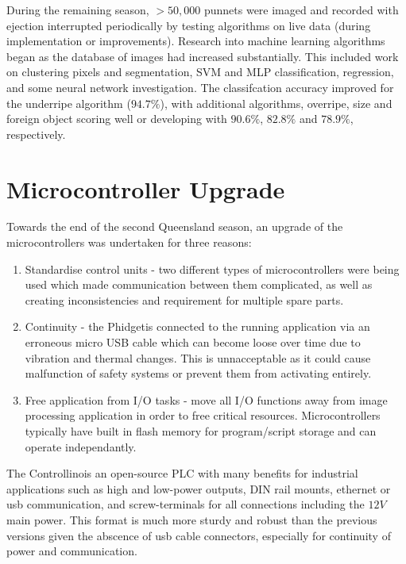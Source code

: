 \documentclass[fleqn,twoside,12pt]{report}
\begin{document}
During the remaining season, $>50,000$ punnets were imaged and recorded with ejection interrupted periodically by testing algorithms on live data (during implementation or improvements). Research into machine learning algorithms began as the database of images had increased substantially. This included work on clustering pixels and segmentation, SVM and MLP classification, regression, and some neural network investigation. The classifcation accuracy improved for the underripe algorithm ($94.7\%$), with additional algorithms, overripe, size and foreign object scoring well or developing with $90.6\%$, $82.8\%$ and $78.9\%$, respectively.


\section{Microcontroller Upgrade}


Towards the end of the second Queensland season, an upgrade of the microcontrollers was undertaken for three reasons:

\begin{enumerate}
	\item Standardise control units - two different types of microcontrollers were being used which made communication between them complicated, as well as creating inconsistencies and requirement for multiple spare parts.
	\item Continuity - the Phidget\texttrademark is connected to the running application via an erroneous micro USB cable which can become loose over time due to vibration and thermal changes. This is unnacceptable as it could cause malfunction of safety systems or prevent them from activating entirely. 
	\item Free application from I/O tasks - move all I/O functions away from image processing application in order to free critical resources. Microcontrollers typically have built in flash memory for program/script storage and can operate independantly.
\end{enumerate}

The Controllino\texttrademark is an open-source PLC with many benefits for industrial applications such as high and low-power outputs, DIN rail mounts, ethernet or usb communication, and screw-terminals for all connections including the $12V$ main power. This format is much more sturdy and robust than the previous versions given the abscence of usb cable connectors, especially for continuity of power and communication.
\end{document}
